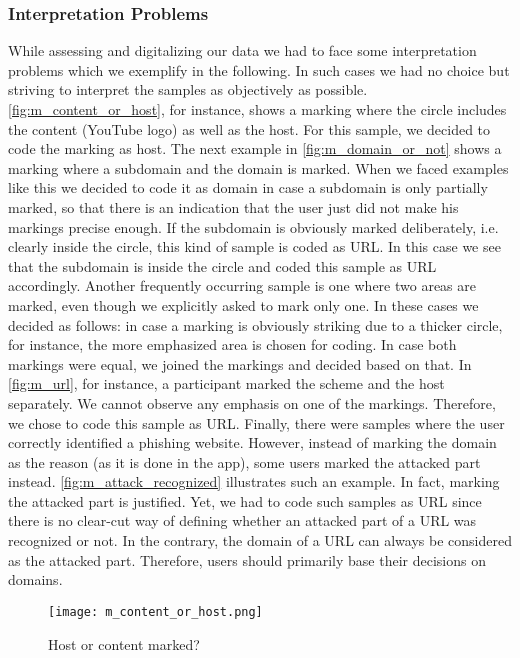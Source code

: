 \subsubsection{Interpretation Problems}
\label{s:intprobs}
While assessing and digitalizing our data we had to face some interpretation problems which we exemplify in the following.
In such cases we had no choice but striving to interpret the samples as objectively as possible.
\autoref{fig:m_content_or_host}, for instance, shows a marking where the circle includes the content (YouTube logo) as well as the host. 
For this sample, we decided to code the marking as host.
The next example in \autoref{fig:m_domain_or_not} shows a marking where a subdomain and the domain is marked. 
When we faced examples like this we decided to code it as domain in case a subdomain is only partially marked, so that there is an indication that the user just did not make his markings precise enough.
If the subdomain is obviously marked deliberately, i.e. clearly inside the circle, this kind of sample is coded as URL.
In this case we see that the subdomain is inside the circle and coded this sample as URL accordingly.
Another frequently occurring sample is one where two areas are marked, even though we explicitly asked to mark only one.
In these cases we decided as follows: in case a marking is obviously striking due to a thicker circle, for instance, the more emphasized area is chosen for coding.
In case both markings were equal, we joined the markings and decided based on that.
In \autoref{fig:m_url}, for instance, a participant marked the scheme and the host separately. 
We cannot observe any emphasis on one of the markings.
Therefore, we chose to code this sample as URL.
Finally, there were samples where the user correctly identified a phishing website.
However, instead of marking the domain as the reason (as it is done in the app), some users marked the attacked part instead.
\autoref{fig:m_attack_recognized} illustrates such an example.
In fact, marking the attacked part is justified. 
Yet, we had to code such samples as URL since there is no clear-cut way of defining whether an attacked part of a URL was recognized or not.
In the contrary, the domain of a URL can always be considered as the attacked part. Therefore, users should primarily base their decisions on domains.

\begin{figure}[H]
\centering
\texttt{[image: m\_content\_or\_host.png]}
\caption{Host or content marked?}
\label{fig:m_content_or_host}
\end{figure}

